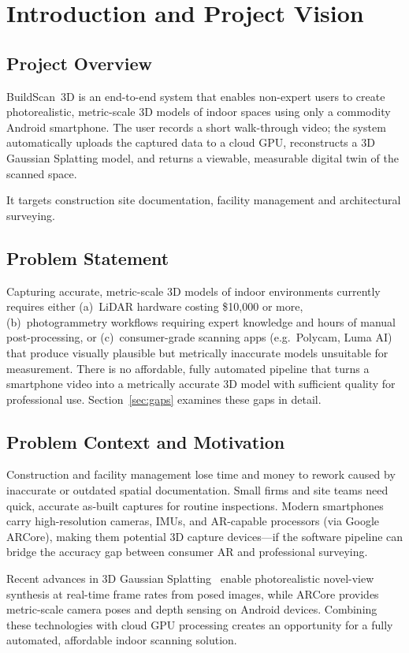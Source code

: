 \chapter{Introduction and Project Vision}

\section{Project Overview}
BuildScan~3D is an end-to-end system that enables non-expert users to create photorealistic, metric-scale 3D models of indoor spaces using only a commodity Android smartphone. The user records a short walk-through video; the system automatically uploads the captured data to a cloud GPU, reconstructs a 3D Gaussian Splatting model, and returns a viewable, measurable digital twin of the scanned space.

It targets construction site documentation, facility management and architectural surveying.

\section{Problem Statement}
Capturing accurate, metric-scale 3D models of indoor environments currently requires either (a)~LiDAR hardware costing \$10{,}000 or more, (b)~photogrammetry workflows requiring expert knowledge and hours of manual post-processing, or (c)~consumer-grade scanning apps (e.g.\ Polycam, Luma AI) that produce visually plausible but metrically inaccurate models unsuitable for measurement. There is no affordable, fully automated pipeline that turns a smartphone video into a metrically accurate 3D model with sufficient quality for professional use. Section~\ref{sec:gaps} examines these gaps in detail.

\section{Problem Context and Motivation}
Construction and facility management lose time and money to rework caused by inaccurate or outdated spatial documentation. Small firms and site teams need quick, accurate as-built captures for routine inspections. Modern smartphones carry high-resolution cameras, IMUs, and AR-capable processors (via Google ARCore), making them potential 3D capture devices---if the software pipeline can bridge the accuracy gap between consumer AR and professional surveying.

Recent advances in 3D Gaussian Splatting~\cite{kerbl3dgs} enable photorealistic novel-view synthesis at real-time frame rates from posed images, while ARCore provides metric-scale camera poses and depth sensing on Android devices. Combining these technologies with cloud GPU processing creates an opportunity for a fully automated, affordable indoor scanning solution.


